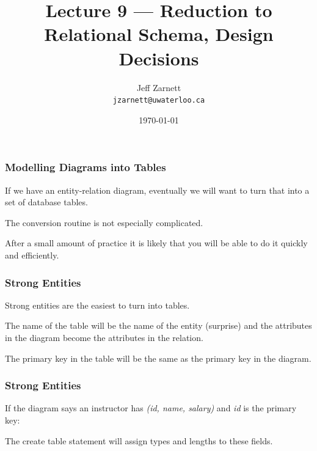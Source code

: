 

\title{Lecture 9 --- Reduction to Relational Schema, Design Decisions}

\author{Jeff Zarnett \\ \small \texttt{jzarnett@uwaterloo.ca}}
\date{\today}




\begin{frame}
  \titlepage

 \end{frame}



\begin{frame}
\frametitle{Modelling Diagrams into Tables}

If we have an entity-relation diagram, eventually we will want to turn that into a set of database tables. 

The conversion routine is not especially complicated. 

After a small amount of practice it is likely that you will be able to do it quickly and efficiently.

\end{frame}



\begin{frame}
\frametitle{Strong Entities}

Strong entities are the easiest to turn into tables. 

The name of the table will be the name of the entity (surprise) and the attributes in the diagram become the attributes in the relation. 

The primary key in the table will be the same as the primary key in the diagram. 


\end{frame}



\begin{frame}
\frametitle{Strong Entities}

If the diagram says an instructor has \textit{(id, name, salary)} and \textit{id} is the primary key:

The create table statement will assign types and lengths to these fields. 

\end{frame}



